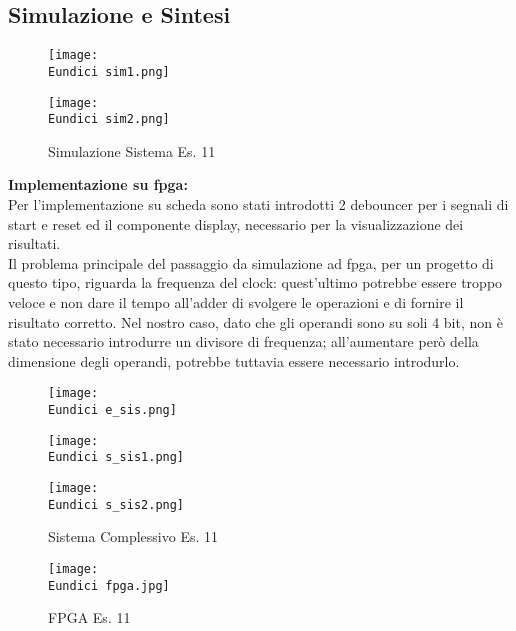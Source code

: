 \documentclass[12pt]{article}
\def \Eundici{Allegati/Esercizio11/}
\begin{document}
{\subsection{Simulazione e Sintesi}
\begin{figure}[ht!]
    \texttt{[image: \\Eundici sim1.png]}
\end{figure}
\begin{figure}[ht!]
    \texttt{[image: \\Eundici sim2.png]}
    \caption{Simulazione Sistema Es. 11}
\end{figure}
{\large \textbf{Implementazione su fpga:}}
\\Per l’implementazione su scheda sono stati introdotti 2 debouncer per i segnali di start e reset ed il componente display, necessario per la visualizzazione dei risultati.
\\Il problema principale del passaggio da simulazione ad fpga, per un progetto di questo tipo, riguarda la frequenza del clock: quest’ultimo potrebbe essere troppo veloce e non dare il tempo all’adder di svolgere le operazioni e di fornire il risultato corretto. Nel nostro caso, dato che gli operandi sono su soli 4 bit, non è stato necessario introdurre un divisore di frequenza; all’aumentare però della dimensione degli operandi, potrebbe tuttavia essere necessario introdurlo.
\begin{figure}[ht!]
    \centering
    \texttt{[image: \\Eundici e\_sis.png]}
\end{figure}
\begin{figure}[ht!]
    \centering
    \texttt{[image: \\Eundici s\_sis1.png]}
\end{figure}
\begin{figure}[ht!]
    \centering
    \texttt{[image: \\Eundici s\_sis2.png]}
    \caption{Sistema Complessivo Es. 11}
\end{figure}
\begin{figure}[ht!]
    \centering
    \texttt{[image: \\Eundici fpga.jpg]}
    \caption{FPGA Es. 11}
\end{figure}
\clearpage
}
\end{document}
